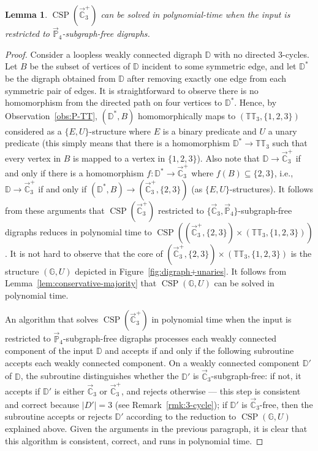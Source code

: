 \documentclass{article}
\newtheorem{lemma}[theorem]{Lemma}
\theoremstyle{definition}
\theoremstyle{remark}
\DeclareMathOperator{\CSP}{CSP}
\newcommand{\bC}{{\mathbb C}}
\newcommand{\bD}{{\mathbb D}}
\newcommand{\bG}{{\mathbb G}}
\newcommand{\bP}{{\mathbb P}}
\newcommand{\bT}{{\mathbb T}}
\begin{document}
\begin{lemma}\label{lem:C3+-P4-subgraph-free}
    $\CSP(\vec{\bC}_3^+)$ can be solved in polynomial-time when the input is restricted
    to $\vec{\bP}_4$-subgraph-free digraphs.
\end{lemma}
\begin{proof}
    Consider a loopless weakly connected digraph $\bD$ with no directed $3$-cycles.
    Let $B$ be the subset of vertices of $\bD$ incident to some symmetric edge, and let
    $\bD^\ast$ be the digraph obtained from $\bD$ after removing exactly one edge from
    each symmetric pair of edges. It is straightforward to observe there is no homomorphism
    from the directed path on four vertices to $\bD^\ast$. Hence, by Observation~\ref{obs:P-TT},
    $(\bD^\ast,B)$ homomorphically maps to $(\bT\bT_3,\{1,2,3\})$ considered as a  $\{E,U\}$-structure
    where $E$ is a binary predicate and $U$ a unary predicate (this simply means that there is a
    homomorphism $\bD^\ast\to \bT\bT_3$ such that every vertex in $B$ is mapped to a vertex in $\{1,2,3\}$).
    Also note that $\bD\to \vec{\bC}_3^+$ if and only if there is a homomorphism $f\colon \bD^\ast\to \vec{\bC}_3^+$
    where $f(B)\subseteq \{2,3\}$, i.e., $\bD \to \vec{\bC}_3^+$ if and only if 
    $(\bD^\ast,B)\to (\vec{\bC}_3^+, \{2,3\})$ (as $\{E,U\}$-structures). It follows from these arguments
    that $\CSP(\vec{\bC}_3^+)$ restricted to $\{\vec{\bC}_3,\vec{\bP}_4\}$-subgraph-free digraphs
    reduces in polynomial time to $\CSP((\vec{\bC}_3^+, \{2,3\}) \times (\bT\bT_3,\{1,2,3\}))$.
    It is not hard to observe that the core of $(\vec{\bC}_3^+, \{2,3\}) \times (\bT\bT_3,\{1,2,3\})$
    is the structure $(\bG,U)$  depicted in Figure~\ref{fig:digraph+unaries}. It follows from
    Lemma~\ref{lem:conservative-majority} that  $\CSP(\bG,U)$ can be solved in polynomial time. 
 
    An algorithm that solves $\CSP(\vec{\bC}_3^+)$ in polynomial time when the input is restricted
    to $\vec{\bP}_4$-subgraph-free digraphs processes each weakly connected component of the input
    $\bD$ and accepts if and only if the following subroutine accepts each weakly connected component.
    On a weakly connected component $\bD'$ of $\bD$, the subroutine distinguishes whether the $\bD'$
    is $\vec{\bC}_3$-subgraph-free: if not,  it accepts if $\bD'$ is either $\vec{\bC}_3$ or $\vec{\bC}_3^+$,
    and rejects otherwise --- this step is consistent and correct because $|D'| = 3$ (see Remark~\ref{rmk:3-cycle}); if
    $\bD'$ is $\vec{\bC}_3$-free, then the subroutine accepts or rejects $\bD'$
    according to the reduction to $\CSP(\bG,U)$ explained above. Given the arguments in the
    previous paragraph, it is clear that this algorithm is consistent, correct, and runs in
    polynomial time. 
\end{proof}
\end{document}
